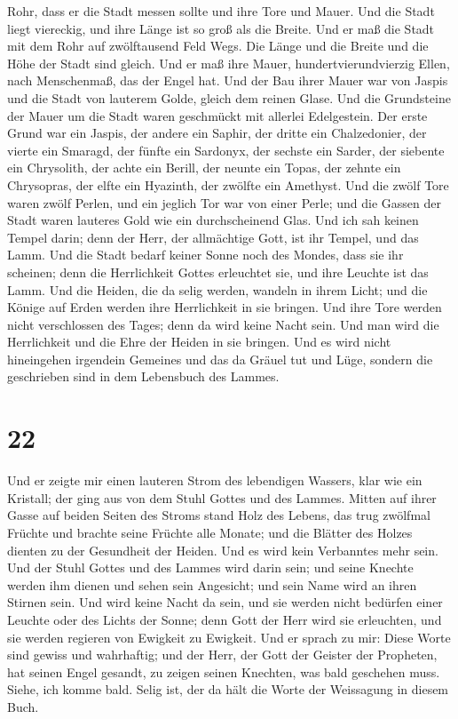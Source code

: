 Rohr, dass er die Stadt messen sollte und ihre Tore und Mauer.
 Und die Stadt liegt viereckig, und ihre Länge ist so
groß als die Breite. Und er maß die Stadt mit dem Rohr auf zwölftausend
Feld Wegs. Die Länge und die Breite und die Höhe der Stadt sind gleich.
 Und er maß ihre Mauer, hundertvierundvierzig Ellen, nach
Menschenmaß, das der Engel hat.  Und der Bau ihrer Mauer
war von Jaspis und die Stadt von lauterem Golde, gleich dem reinen
Glase.  Und die Grundsteine der Mauer um die Stadt waren
geschmückt mit allerlei Edelgestein. Der erste Grund war ein Jaspis, der
andere ein Saphir, der dritte ein Chalzedonier, der vierte ein Smaragd,
 der fünfte ein Sardonyx, der sechste ein Sarder, der
siebente ein Chrysolith, der achte ein Berill, der neunte ein Topas, der
zehnte ein Chrysopras, der elfte ein Hyazinth, der zwölfte ein Amethyst.
 Und die zwölf Tore waren zwölf Perlen, und ein jeglich
Tor war von einer Perle; und die Gassen der Stadt waren lauteres Gold
wie ein durchscheinend Glas.  Und ich sah keinen Tempel
darin; denn der Herr, der allmächtige Gott, ist ihr Tempel, und das
Lamm.  Und die Stadt bedarf keiner Sonne noch des Mondes,
dass sie ihr scheinen; denn die Herrlichkeit Gottes erleuchtet sie, und
ihre Leuchte ist das Lamm.  Und die Heiden, die da selig
werden, wandeln in ihrem Licht; und die Könige auf Erden werden ihre
Herrlichkeit in sie bringen.  Und ihre Tore werden nicht
verschlossen des Tages; denn da wird keine Nacht sein. 
Und man wird die Herrlichkeit und die Ehre der Heiden in sie bringen.
 Und es wird nicht hineingehen irgendein Gemeines und das
da Gräuel tut und Lüge, sondern die geschrieben sind in dem Lebensbuch
des Lammes.

\hypertarget{section-21}{%
\section{22}\label{section-21}}

 Und er zeigte mir einen lauteren Strom des lebendigen
Wassers, klar wie ein Kristall; der ging aus von dem Stuhl Gottes und
des Lammes.  Mitten auf ihrer Gasse auf beiden Seiten des
Stroms stand Holz des Lebens, das trug zwölfmal Früchte und brachte
seine Früchte alle Monate; und die Blätter des Holzes dienten zu der
Gesundheit der Heiden.  Und es wird kein Verbanntes mehr
sein. Und der Stuhl Gottes und des Lammes wird darin sein; und seine
Knechte werden ihm dienen  und sehen sein Angesicht; und
sein Name wird an ihren Stirnen sein.  Und wird keine
Nacht da sein, und sie werden nicht bedürfen einer Leuchte oder des
Lichts der Sonne; denn Gott der Herr wird sie erleuchten, und sie werden
regieren von Ewigkeit zu Ewigkeit.  Und er sprach zu mir:
Diese Worte sind gewiss und wahrhaftig; und der Herr, der Gott der
Geister der Propheten, hat seinen Engel gesandt, zu zeigen seinen
Knechten, was bald geschehen muss.  Siehe, ich komme bald.
Selig ist, der da hält die Worte der Weissagung in diesem Buch.

